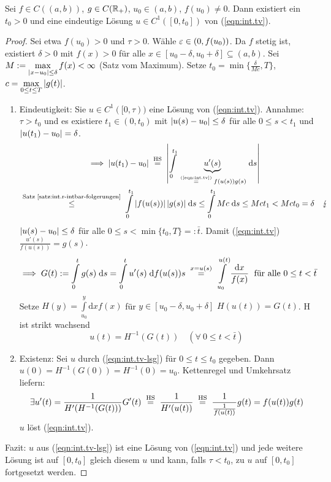 \documentclass[12pt]{scrreprt}
\begin{document}
\begin{satz}
  \label{satz:int.tv}
  Sei $f\in C((a,b))$, $g\in C(\mathbb{R}_+)$,
  $u_0\in(a,b)$, $f(u_0)\neq0$. Dann existiert ein $t_0>0$ und eine
  eindeutige Lösung $u\in C^1([0,t_0])$ von (\ref{eqn:int.tv}).
\end{satz}
\begin{proof}
  Sei etwa $f(u_0)>0$ und $\tau>0$. Wähle $\varepsilon\in(0,f(u_0))$. Da $f$
  stetig ist, existiert $\delta>0$ mit $f(x)>0$ für alle
  $x\in[u_0-\delta, u_0+\delta] \subseteq (a,b)$. Sei
  $M:=\max\limits_{\left\lvert x-u_0\right\lvert\le\delta}{f(x)}<\infty$ (Satz vom
  Maximum). Setze $t_0=\min{\{\frac{\delta}{Mc}, T\}}$,
  $c=\max\limits_{0\le t\le T}{\left\lvert g(t)\right\lvert}$.
  \begin{enumerate}
  \item Eindeutigkeit: Sie $u\in C^1([0,\tau))$ eine Lösung von
    (\ref{eqn:int.tv}). Annahme: $\tau>t_0$ und es existiere
    $t_1\in(0,t_0)$ mit $\left\lvert u(s)-u_0\right\lvert\le\delta$ für alle $0\le
    s<t_1$ und $\left\lvert u(t_1)-u_0\right\lvert=\delta$.
    \begin{multline*}
      \folgt \abs{u(t_1)-u_0} \nach{=}{HS}
      \abs{\Integral{0}{t_1}{\underbrace{u'(s)}_
          {\nach{=}{(\ref{eqn:int.tv})}f(u(s))g(s)}}{s}}
      \\\nach{\le}{Satz \ref{satz:int.r-intbar-folgerungen}}
      \Integral{0}{t_1}{\abs{f(u(s))}\abs{g(s)}}{s} \le
      \Integral{0}{t_1}{Mc}{s} \le Mct_1 < Mct_0=\delta \quad \blitz
    \end{multline*}
    \folgt $\left\lvert u(s)-u_0\right\lvert\le\delta$ für alle $0\le s <
    \min{\{t_0,T\}}=:\bar{t}$. Damit (\ref{eqn:int.tv})\folgt
    $\frac{u'(s)}{f(u(s))}=g(s)$.
    \begin{equation}
      \label{eqn:int.tv-g}
      \folgt G(t):=\Integral{0}{t}{g(s)}{s} =
      \Integral{0}{t}{u'(s)}{f(u(s))}{s} \wegen{=}{x=u(s)}
      \int\limits_{u_0}^{u(t)}{\frac{\mathrm{d}x}{f(x)}} \; \text{ für
        alle } 0\le t <\bar{t}
    \end{equation}
    Setze $H(y)=\int\limits_{u_0}^{y}{\mathrm{d}x}{f(x)}$ für
    $y\in[u_0-\delta, u_0+\delta]$ \folgt $H(u(t))=G(t)$. H ist strikt
    wachsend
    \begin{equation} \label{eqn:int.tv-lsg}
      u(t) = H^{-1}(G(t)) \quad (\forall\ 0\le t<\bar{t})
    \end{equation}
  \item Existenz: Sei $u$ durch (\ref{eqn:int.tv-lsg}) für $0\le
    t\le t_0$ gegeben. Dann
    $u(0)=H^{-1}(G(0))=H^{-1}(0)=u_0$. Kettenregel und Umkehrsatz
    liefern: \[\exists u'(t)=\frac{1}{H'(H^{-1}(G(t)))}G'(t)
    \nach{=}{HS} \frac{1}{H'(u(t))} \nach{=}{HS}
    \frac{1}{\frac{1}{f(u(t))}}g(t) = f(u(t))g(t)\]
    \folgt $u$ löst (\ref{eqn:int.tv}).
  \end{enumerate}
  Fazit: $u$ aus (\ref{eqn:int.tv-lsg}) ist eine Lösung von
  (\ref{eqn:int.tv}) und jede weitere Lösung ist auf $[0,t_0]$ gleich
  diesem $u$ und kann, falls $\tau<t_0$, zu $u$ auf $[0,t_0]$
  fortgesetzt werden. %
\end{proof}
\end{document}
